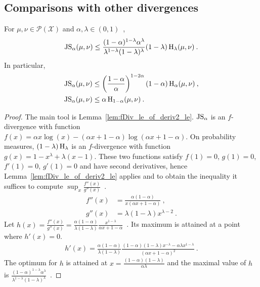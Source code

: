 \subsection{Comparisons with other divergences}

\begin{lemma}
  \label{lem:jensenShannon_le_hellingerAlpha}
  For $\mu, \nu \in \mathcal P(\mathcal X)$ and $\alpha, \lambda \in (0,1)$~,
  \begin{align*}
  \operatorname{JS}_\alpha(\mu, \nu) \le \frac{(1 - \alpha)^{1 - \lambda} \alpha^\lambda}{\lambda^{1 - \lambda} (1 - \lambda)^\lambda} (1 - \lambda)\operatorname{H}_\lambda(\mu, \nu) \: .
  \end{align*}
  In particular,
  \begin{align*}
  \operatorname{JS}_\alpha(\mu, \nu)
  &\le \left(\frac{1 - \alpha}{\alpha}\right)^{1 - 2 \alpha} (1 - \alpha)\operatorname{H}_\alpha(\mu, \nu)
  \: , \\
  \operatorname{JS}_\alpha(\mu, \nu)
  &\le \alpha \operatorname{H}_{1 - \alpha}(\mu, \nu)
  \: .
  \end{align*}
\end{lemma}

\begin{proof}%
{}
The main tool is Lemma~\ref{lem:fDiv_le_of_deriv2_le}.
$\operatorname{JS}_\alpha$ is an $f$-divergence with function $f(x) = \alpha x \log(x) - (\alpha x + 1 - \alpha) \log (\alpha x + 1 - \alpha)$. On probability measures, $(1 - \lambda)\operatorname{H}_\lambda$ is an $f$-divergence with function $g(x) = 1 - x^\lambda + \lambda(x-1)$.
These two functions satisfy $f(1) = 0$, $g(1) = 0$, $f'(1) = 0$, $g'(1) = 0$ and have second derivatives, hence Lemma~\ref{lem:fDiv_le_of_deriv2_le} applies and to obtain the inequality it suffices to compute $\sup_x\frac{f''(x)}{g''(x)}$~.
\begin{align*}
f''(x)
&= \frac{\alpha(1 - \alpha)}{x(\alpha x + 1 - \alpha)}
\: , \\
g''(x)
&= \lambda (1 - \lambda) x^{\lambda - 2}
\: .
\end{align*}
Let $h(x) = \frac{f''(x)}{g''(x)} = \frac{\alpha (1 - \alpha)}{\lambda (1 - \lambda)} \frac{x^{1 - \lambda}}{\alpha x + 1 - \alpha}$~. Its maximum is attained at a point where $h'(x) = 0$.
\begin{align*}
h'(x) = \frac{\alpha (1 - \alpha)}{\lambda (1 - \lambda)} \frac{(1 - \alpha)(1 - \lambda)x^{-\lambda} - \alpha \lambda x^{1 - \lambda}}{(\alpha x + 1 - \alpha)^2}
\: .
\end{align*}
The optimum for $h$ is attained at $x = \frac{(1 - \alpha)(1 - \lambda)}{\alpha \lambda}$ and the maximal value of $h$ is $\frac{(1 - \alpha)^{1 - \lambda} \alpha^\lambda}{\lambda^{1 - \lambda} (1 - \lambda)^\lambda}$~.
\end{proof}


